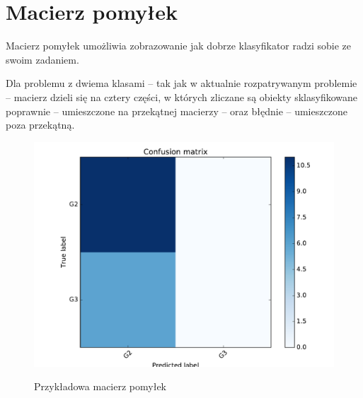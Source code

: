 \section{Macierz pomyłek}
Macierz pomyłek umożliwia zobrazowanie jak dobrze klasyfikator radzi sobie ze swoim zadaniem.

Dla problemu z dwiema klasami -- tak jak w aktualnie rozpatrywanym problemie -- macierz dzieli się na cztery części, w których zliczane są obiekty sklasyfikowane poprawnie -- umieszczone na przekątnej macierzy -- oraz błędnie -- umieszczone poza przekątną.
\begin{figure}[h!]
	\centering
	\includegraphics[width=\linewidth]{img/conf_matrix.pdf}
	\label{Rysunek}
	\caption{Przykładowa macierz pomyłek}
\end{figure}